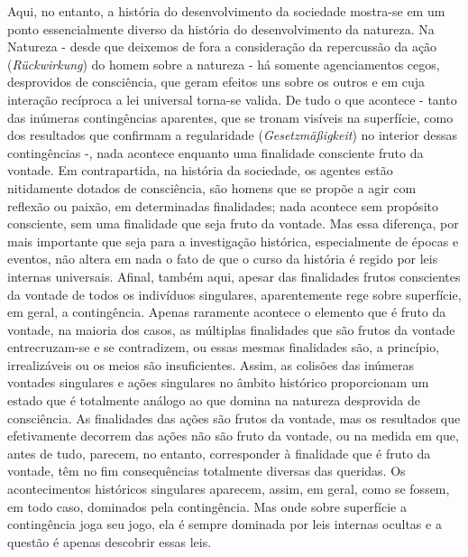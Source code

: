 Aqui, no entanto, a história do desenvolvimento da sociedade mostra-se
em um ponto essencialmente diverso da história do desenvolvimento da
natureza. Na Natureza - desde que deixemos de fora a consideração da
repercussão da ação (\emph{Rückwirkung}) do homem sobre a natureza - há
somente agenciamentos cegos, desprovidos de consciência, que geram
efeitos uns sobre os outros e em cuja interação recíproca a lei
universal torna-se valida. De tudo o que acontece - tanto das inúmeras
contingências aparentes, que se tronam visíveis na superfície, como dos
resultados que confirmam a regularidade (\emph{Gesetzmäßigkeit}) no
interior dessas contingências -, nada acontece enquanto uma finalidade
consciente fruto da vontade. Em contrapartida, na história da sociedade,
os agentes estão nitidamente dotados de consciência, são homens que se
propõe a agir com reflexão ou paixão, em determinadas finalidades; nada
acontece sem propósito consciente, sem uma finalidade que seja fruto da
vontade. Mas essa diferença, por mais importante que seja para a
investigação histórica, especialmente de épocas e eventos, não altera em
nada o fato de que o curso da história é regido por leis internas
universais. Afinal, também aqui, apesar das finalidades frutos
conscientes da vontade de todos os indivíduos singulares, aparentemente
rege sobre superfície, em geral, a contingência. Apenas raramente
acontece o elemento que é fruto da vontade, na maioria dos casos, as
múltiplas finalidades que são frutos da vontade entrecruzam-se e se
contradizem, ou essas mesmas finalidades são, a princípio, irrealizáveis
ou os meios são insuficientes. Assim, as colisões das inúmeras vontades
singulares e ações singulares no âmbito histórico proporcionam um estado
que é totalmente análogo ao que domina na natureza desprovida de
consciência. As finalidades das ações são frutos da vontade, mas os
resultados que efetivamente decorrem das ações não são fruto da vontade,
ou na medida em que, antes de tudo, parecem, no entanto, corresponder à
finalidade que é fruto da vontade, têm no fim consequências totalmente
diversas das queridas. Os acontecimentos históricos singulares aparecem,
assim, em geral, como se fossem, em todo caso, dominados pela
contingência. Mas onde sobre superfície a contingência joga seu jogo,
ela é sempre dominada por leis internas ocultas e a questão é apenas
descobrir essas leis.

